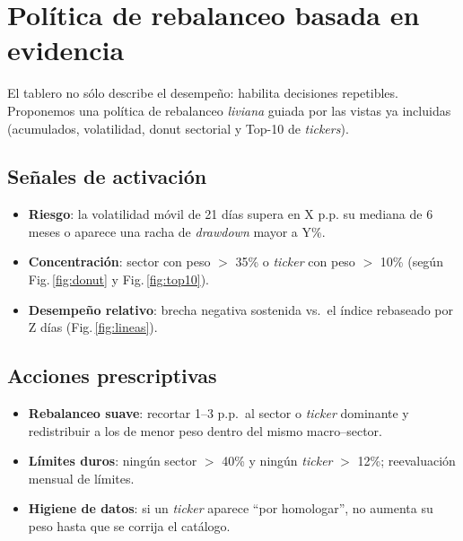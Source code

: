 \documentclass[conference]{IEEEtran}
\begin{document}
\section{Política de rebalanceo basada en evidencia}
El tablero no sólo describe el desempeño: habilita decisiones repetibles. Proponemos una política de rebalanceo \emph{liviana} guiada por las vistas ya incluidas (acumulados, volatilidad, donut sectorial y Top-10 de \emph{tickers}).

\subsection{Señales de activación}
\begin{itemize}
    \item \textbf{Riesgo}: la volatilidad móvil de 21 días supera en X p.p. su mediana de 6 meses o aparece una racha de \emph{drawdown} mayor a Y\%.
    \item \textbf{Concentración}: sector con peso $>$ 35\% o \emph{ticker} con peso $>$ 10\% (según Fig.\,\ref{fig:donut} y Fig.\,\ref{fig:top10}).
    \item \textbf{Desempeño relativo}: brecha negativa sostenida vs.\ el índice rebaseado por Z días (Fig.\,\ref{fig:lineas}).
\end{itemize}

\subsection{Acciones prescriptivas}
\begin{itemize}
    \item \textbf{Rebalanceo suave}: recortar 1--3 p.p.\ al sector o \emph{ticker} dominante y redistribuir a los de menor peso dentro del mismo macro–sector.
    \item \textbf{Límites duros}: ningún sector $>$ 40\% y ningún \emph{ticker} $>$ 12\%; reevaluación mensual de límites.
    \item \textbf{Higiene de datos}: si un \emph{ticker} aparece “por homologar”, no aumenta su peso hasta que se corrija el catálogo.
\end{itemize}
\end{document}
